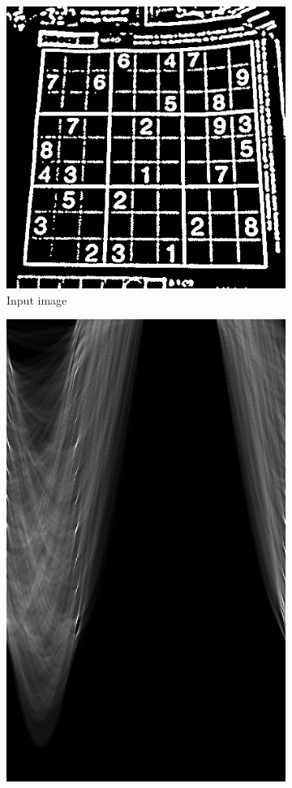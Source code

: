 \begin{figure}
    \begin{subfigure}{0.3\textwidth}
        \includegraphics[width=\linewidth] {../../test/threshold/1.jpg}
        \caption{Input image}\label{fig:sht_example:a}
    \end{subfigure}\hfill
    \begin{subfigure}{0.3\textwidth}
        \centering
        \includegraphics[height=\linewidth] {../../packages/js-benchmarks/img/seq.png}

\end{subfigure}
\end{figure}
